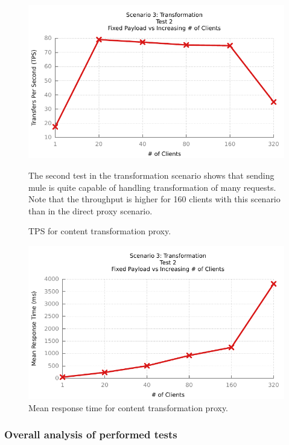 \begin{figure}[H]
	\caption{TPS for content transformation proxy.}
	\centerline{\includegraphics{img/transform_fp_iu_tps}}
	\label{fig:transform-2-1}
	The second test in the transformation scenario shows that sending mule is quite capable of handling transformation of many requests. Note that the throughput is higher for 160 clients with this scenario than in the direct proxy scenario.

\end{figure}

\begin{figure}[H]
	\caption{Mean response time for content transformation proxy.}
	\centerline{\includegraphics{img/transform_fp_iu_resp}}
	\label{fig:transform-2-2}
\end{figure}


\subsubsection{Overall analysis of performed tests}
\label{sec:test-final-analysis}

